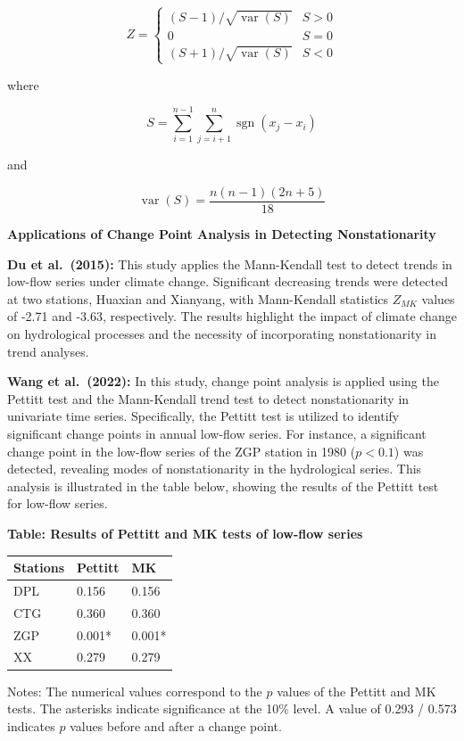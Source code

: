 \documentclass[
]{krantz}
\begin{document}
\[
Z=\left\{\begin{array}{cc}
(S-1) / \sqrt{\operatorname{var}(S)} & S>0 \\
0 & S=0 \\
(S+1) / \sqrt{\operatorname{var}(S)} & S<0
\end{array}\right.\tag{3}
\]

where

\[
S=\sum_{i=1}^{n-1} \sum_{j=i+1}^{n} \operatorname{sgn}\left(x_{j}-x_{i}\right)
\]

and

\[
\operatorname{var}(S)=\frac{n(n-1)(2n+5)}{18}
\]

\textbf{Applications of Change Point Analysis in Detecting Nonstationarity}

\textbf{Du et al.~(2015):} This study applies the Mann-Kendall test to detect trends in low-flow series under climate change. Significant decreasing trends were detected at two stations, Huaxian and Xianyang, with Mann-Kendall statistics \(Z_{MK}\) values of -2.71 and -3.63, respectively. The results highlight the impact of climate change on hydrological processes and the necessity of incorporating nonstationarity in trend analyses.

\textbf{Wang et al.~(2022):} In this study, change point analysis is applied using the Pettitt test and the Mann-Kendall trend test to detect nonstationarity in univariate time series. Specifically, the Pettitt test is utilized to identify significant change points in annual low-flow series. For instance, a significant change point in the low-flow series of the ZGP station in 1980 (\(p < 0.1\)) was detected, revealing modes of nonstationarity in the hydrological series. This analysis is illustrated in the table below, showing the results of the Pettitt test for low-flow series.

\textbf{Table: Results of Pettitt and MK tests of low-flow series}

\begin{longtable}[]{@{}lll@{}}
\toprule\noalign{}
Stations & Pettitt & MK \\
\midrule\noalign{}
\endhead
\bottomrule\noalign{}
\endlastfoot
DPL & 0.156 & 0.156 \\
CTG & 0.360 & 0.360 \\
ZGP & 0.001* & 0.001* \\
XX & 0.279 & 0.279 \\
\end{longtable}

Notes: The numerical values correspond to the \(p\) values of the Pettitt and MK tests. The asterisks indicate significance at the 10\% level. A value of 0.293 / 0.573 indicates \(p\) values before and after a change point.
\end{document}
